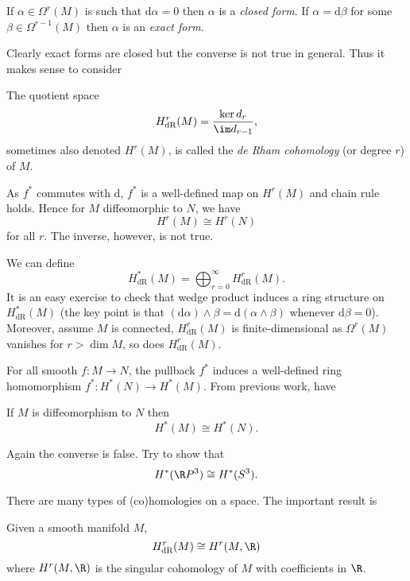 \documentclass[a4paper]{article}
\newcommand{\w}{\wedge}
\begin{document}
\begin{definition}
  If \(\alpha \in \Omega^r(M)\) is such that \(\mathrm d \alpha = 0\) then \(\alpha\) is a \emph{closed form}. If \(\alpha = \mathrm d \beta\) for some \(\beta \in \Omega^{r - 1}(M)\) then \(\alpha\) is an \emph{exact form}.
\end{definition}

Clearly exact forms are closed but the converse is not true in general. Thus it makes sense to consider

\begin{definition}
  The quotient space
  \[
    H^r_{\text{dR}}(M) = \frac{\ker d_r}{\im d_{r - 1}},
  \]
  sometimes also denoted \(H^r(M)\), is called the \emph{de Rham cohomology} (or degree \(r\)) of \(M\).
\end{definition}

As \(f^*\) commutes with \(\mathrm d\), \(f^*\) is a well-defined map on \(H^r(M)\) and chain rule holds. Hence for \(M\) diffeomorphic to \(N\), we have
\[
  H^r(M) \cong H^r(N)
\]
for all \(r\). The inverse, however, is not true.

We can define
\[
  H^*_\text{dR}(M) = \bigoplus_{r = 0}^\infty H^r_{\text{dR}}(M).
\]
It is an easy exercise to check that wedge product induces a ring structure on \(H^*_{\text{dR}}(M)\) (the key point is that \((\mathrm d \alpha) \w \beta = \mathrm d(\alpha \w \beta)\) whenever \(\mathrm d \beta = 0\)). Moreover, assume \(M\) is connected, \(H^r_{\text{dR}}(M)\) is finite-dimensional as \(\Omega^r(M)\) vanishes for \(r > \dim M\), so does \(H^r_{\text{dR}}(M)\).

For all smooth \(f: M \to N\), the pullback \(f^*\) induces a well-defined ring homomorphism \(f^*: H^*(N) \to H^*(M)\). From previous work, have

\begin{proposition}
  If \(M\) is diffeomorphism to \(N\)  then
  \[
    H^*(M) \cong H^*(N).
  \]
\end{proposition}

Again the converse is false. Try to show that
\[
  H^*(\R P^3) \cong H^*(S^3).
\]

There are many types of (co)homologies on a space. The important result is

\begin{theorem}[de Rham]
  Given a smooth manifold \(M\),
  \[
    H^r_{\text{dR}}(M) \cong H^r(M, \R)
  \]
  where \(H^r(M, \R)\) is the singular cohomology of \(M\) with coefficients in \(\R\).
\end{theorem}
\end{document}
